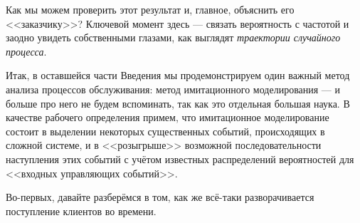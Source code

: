 \documentclass[12pt]{extarticle}
\begin{document}


Как мы можем проверить этот результат и, главное, объяснить его <<заказчику>>? 
Ключевой момент здесь --- связать вероятность с частотой и заодно увидеть
собственными глазами, как выглядят \emph{траектории случайного процесса}.

Итак, в оставшейся части Введения мы продемонстрируем один важный метод анализа
процессов обслуживания: метод имитационного моделирования --- и больше про него
не будем вспоминать, так как это отдельная большая наука. В качестве рабочего
определения примем, что имитационное моделирование состоит в выделении некоторых
существенных событий, происходящих в сложной системе, и в <<розыгрыше>>
возможной последовательности наступления этих событий с учётом известных
распределений вероятностей для <<входных управляющих событий>>. 

Во-первых, давайте разберёмся в том, как же всё-таки разворачивается поступление
клиентов во времени.
\end{document}
